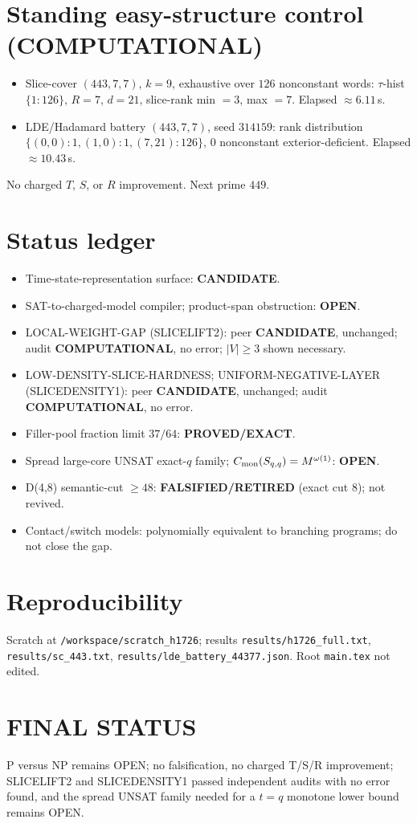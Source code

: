 \documentclass[11pt]{article}
\begin{document}
\section*{Standing easy-structure control (COMPUTATIONAL)}
\begin{itemize}
\item Slice-cover $(443,7,7)$, $k=9$, exhaustive over $126$ nonconstant words: $\tau$-hist $\{1{:}126\}$, $R=7$, $d=21$, slice-rank min $=3$, max $=7$. Elapsed $\approx6.11$\,s.
\item LDE/Hadamard battery $(443,7,7)$, seed $314159$: rank distribution $\{(0,0){:}1,(1,0){:}1,(7,21){:}126\}$, $0$ nonconstant exterior-deficient. Elapsed $\approx10.43$\,s.
\end{itemize}
No charged $T$, $S$, or $R$ improvement. Next prime $449$.

\section*{Status ledger}
\begin{itemize}
\item Time-state-representation surface: \textbf{CANDIDATE}.
\item SAT-to-charged-model compiler; product-span obstruction: \textbf{OPEN}.
\item LOCAL-WEIGHT-GAP (SLICELIFT2): peer \textbf{CANDIDATE}, unchanged; audit \textbf{COMPUTATIONAL}, no error; $|V|\ge3$ shown necessary.
\item LOW-DENSITY-SLICE-HARDNESS; UNIFORM-NEGATIVE-LAYER (SLICEDENSITY1): peer \textbf{CANDIDATE}, unchanged; audit \textbf{COMPUTATIONAL}, no error.
\item Filler-pool fraction limit $37/64$: \textbf{PROVED/EXACT}.
\item Spread large-core UNSAT exact-$q$ family; $C_{\rm mon}(S_{q,q})=M^{\omega(1)}$: \textbf{OPEN}.
\item D(4,8) semantic-cut $\ge48$: \textbf{FALSIFIED/RETIRED} (exact cut 8); not revived.
\item Contact/switch models: polynomially equivalent to branching programs; do not close the gap.
\end{itemize}

\section*{Reproducibility}
Scratch at \texttt{/workspace/scratch\_h1726}; results \texttt{results/h1726\_full.txt}, \texttt{results/sc\_443.txt}, \texttt{results/lde\_battery\_44377.json}. Root \texttt{main.tex} not edited.

\section*{FINAL STATUS}
P versus NP remains OPEN; no falsification, no charged T/S/R improvement; SLICELIFT2 and SLICEDENSITY1 passed independent audits with no error found, and the spread UNSAT family needed for a $t=q$ monotone lower bound remains OPEN.
\end{document}
